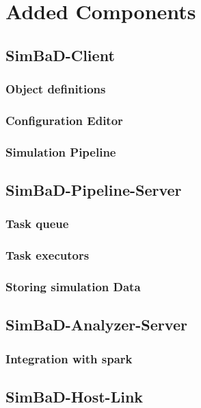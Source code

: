 \chapter{Added Components}
\section{SimBaD-Client}
\subsection{Object definitions}
\subsection{Configuration Editor}
\subsection{Simulation Pipeline}
\section{SimBaD-Pipeline-Server}
\subsection{Task queue}
\subsection{Task executors}
\subsection{Storing simulation Data}
\section{SimBaD-Analyzer-Server}
\subsection{Integration with spark}
\section{SimBaD-Host-Link}
